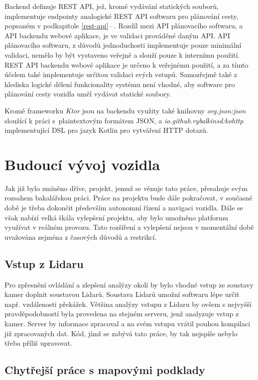 \documentclass[czech, bachelor]{diploma}
\newcommand{\filipref}[1]{\ref{#1}\,--\,\nameref{#1}}
\begin{document}
Backend definuje REST API, jež, kromě vydávání statických souborů, implementuje endpointy analogické REST API softwaru
pro plánování cesty, popsaném v podkapitole \filipref{rest-api}. Rozdíl mezi API plánovacího softwaru, a API backendu webové
aplikace, je ve validaci prováděné daným API. API plánovacího softwaru, z důvodů jednoduchosti implementuje pouze minimální
validaci, nemělo by být vystaveno veřejně a slouží pouze k internímu použití. REST API backendu webové aplikace je určeno
k veřejnému použití, a za tímto účelem také implementuje určitou validaci svých vstupů. Samozřejmě také z hlediska logické dělení
funkcionality systému není vhodné, aby software pro plánování cesty vozidla uměl vydávat statické soubory.

Kromě frameworku \emph{Ktor} jsou na backendu využity také knihovny \emph{org.json:json} sloužící k práci s~plaintextovým formátem
JSON, a \emph{io.github.rybalkinsd:kohttp} implementující DSL pro jazyk Kotlin pro vytváření HTTP dotazů.

\chapter{Budoucí vývoj vozidla}

Jak již bylo zmíněno dříve, projekt, jemuž se věnuje tato práce, přesahuje svým rozsahem bakalářskou práci. Práce na projektu bude
dále pokračovat, v současné době je třeba dokončit především autonomní řízení a navigaci vozidla. Dále se však nabízí velká škála
vylepšení projektu, aby bylo umožněno platformu využívat v reálném provozu. Tato rozšíření a vylepšení nejsou v momentální době
uvažována zejména z časových důvodů a restrikcí.

\section{Vstup z Lidaru}

Pro zpřesnění ovládání a zlepšení analýzy okolí by bylo vhodné vstup ze soustavy kamer doplnit soustavou Lidarů. Soustava Lidarů
umožní softwaru lépe určit např. vzdálenosti překážek. Většina analýzy vstupu z Lidaru by ovšem s nejvyšší pravděpodobností byla
provedena na stejném serveru, jenž analyzuje vstup z kamer. Server by informace zpracoval a na svém vstupu vrátil pouhou kompilaci
již zpracovaných dat. Kód, jímž se zabývá tato práce, by tak nejspíše nebylo třeba příliš upravovat.

\section{Chytřejší práce s mapovými podklady} \label{smarter-maps}
\end{document}
